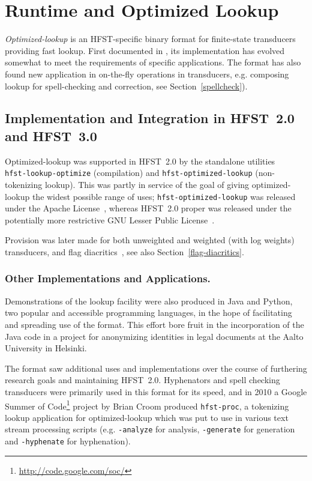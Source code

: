 \documentclass{llncs}
\begin{document}
\section{Runtime and Optimized Lookup}\label{hfst:optimized-lookup}
\emph{Optimized-lookup} is an HFST-specific binary format for finite-state
transducers providing fast lookup. First documented in \cite{silfverberg/2009},
its implementation has evolved somewhat to meet the requirements of specific
applications. The format has also found new application in on-the-fly
operations in transducers, e.g. composing lookup for spell-checking and
correction,  see Section~\ref{spellcheck}).

\subsection{Implementation and Integration in HFST~2.0 and HFST~3.0}
Optimized-lookup was supported in HFST~2.0 by the standalone utilities\\
\verb+hfst-lookup-optimize+ (compilation) and
\verb+hfst-optimized-lookup+ (non-token\-izing lookup). This was partly
in service of the goal of giving optimized-lookup the widest possible range
of uses; \verb+hfst-optimized-lookup+ was released under the
Apache License~\cite{apache-license}, whereas HFST~2.0 proper was released
under the potentially more restrictive GNU Lesser Public
License~\cite{lgpl-license}.

Provision was later made for both unweighted and weighted (with log weights)
transducers, and flag diacritics~\cite{beesley/2003}, see also Section~\ref{flag-diacritics}.

\subsubsection{Other Implementations and Applications.}
Demonstrations of the lookup facility were also
produced in Java and Python, two popular and accessible programming languages,
in the hope of facilitating and spreading use of the format. This effort
bore fruit in the incorporation of the Java code in a project for anonymizing
identities in legal documents at the Aalto University in Helsinki.

The format saw additional uses and implementations over the course of 
furthering research goals and maintaining HFST~2.0. Hyphenators and spell
checking transducers were primarily used in this format for its speed, and
in 2010 a Google Summer of Code\footnote{\url{http://code.google.com/soc/}} project by Brian Croom produced
\verb+hfst-proc+, a tokenizing lookup application for optimized-lookup which
was put to use in various text stream processing scripts (e.g.
\verb+-analyze+ for analysis, \verb+-generate+ for generation and
\verb+-hyphenate+ for hyphenation).
\end{document}
